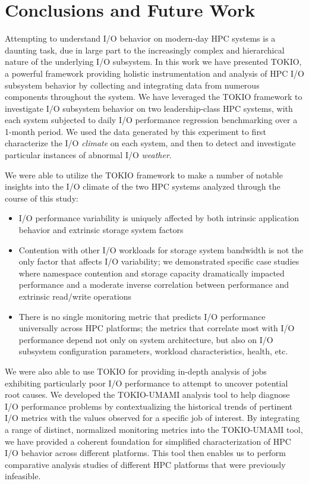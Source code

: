 \section{Conclusions and Future Work} \label{sec:conclusions}

Attempting to understand I/O behavior on modern-day HPC systems is a daunting task, due in large part to the increasingly complex and hierarchical nature of the underlying I/O subsystem.
In this work we have presented TOKIO, a powerful framework providing holistic instrumentation and analysis of HPC I/O subsystem behavior by collecting and integrating data from numerous components throughout the system.
We have leveraged the TOKIO framework to investigate I/O subsystem behavior on two leadership-class HPC systems, with each system subjected to daily I/O performance regression benchmarking over a 1-month period.
We used the data generated by this experiment to first characterize the I/O \emph{climate} on each system, and then to detect and investigate particular instances of abnormal I/O \emph{weather}.

We were able to utilize the TOKIO framework to make a number of notable insights into the I/O climate of the two HPC systems analyzed through the course of this study:

\begin{itemize}
\item I/O performance variability is uniquely affected by both intrinsic application behavior and extrinsic storage system factors
\item Contention with other I/O workloads for storage system bandwidth is not the only factor that affects I/O variability; %
we demonstrated specific case studies where namespace contention and storage capacity dramatically impacted performance and a moderate inverse correlation between performance and extrinsic read/write operations
\item There is no single monitoring metric that predicts I/O performance universally across HPC platforms; the metrics that correlate most with I/O performance depend not only on system architecture, but also on I/O subsystem configuration parameters, workload characteristics, health, etc.
\end{itemize}

We were also able to use TOKIO for providing in-depth analysis of jobs exhibiting particularly poor I/O performance to attempt to uncover potential root causes.
We developed the TOKIO-UMAMI analysis tool to help diagnose I/O performance problems by contextualizing the historical trends of pertinent I/O metrics with the values observed for a specific job of interest.
By integrating a range of distinct, normalized monitoring metrics into the TOKIO-UMAMI tool, we have provided a coherent foundation for simplified characterization of HPC I/O behavior across different platforms.
This tool then enables us to perform comparative analysis studies of different HPC platforms that were previously infeasible.

